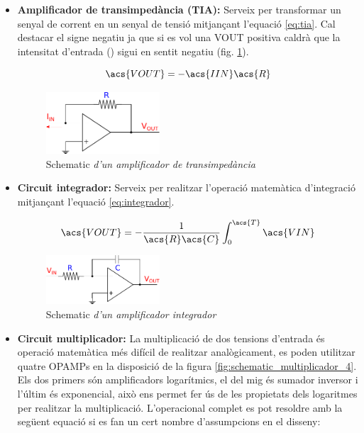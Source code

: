 \begin{itemize}
	\item{\textbf{Amplificador de transimpedància (\ac{TIA}): }}Serveix per transformar un senyal de corrent en un senyal de tensió mitjançant l'equació \ref{eq:tia}. Cal destacar el signe negatiu ja que si es vol una \ac{VOUT} positiva caldrà que la intensitat d'entrada () sigui en sentit negatiu (fig. \ref{fig:schematic_transimpedancia}).
	
	\begin{equation}\label{eq:tia}
	\acs{VOUT} = -\acs{IIN}\acs{R}
	\end{equation}
	
	\begin{figure}[htp]
		\centering
		\includegraphics[width=0.4\textwidth]{Figures/schematic_transimpedancia.pdf}
		\caption[Amplificador de transimpedància]{Schematic\textit{ d'un amplificador de transimpedància}}
		\label{fig:schematic_transimpedancia}
	\end{figure}
	
	\item {\textbf{Circuit integrador: }}Serveix per realitzar l'operació matemàtica d'integració mitjançant l'equació \ref{eq:integrador}.
	
	\begin{equation}\label{eq:integrador}
	\acs{VOUT} = -\frac{\num{1}}{\acs{R}\acs{C}}\int_{\num{0}}^{\acs{T}}\acs{VIN}
	\end{equation}
	
	\begin{figure}[htp]
		\centering
		\includegraphics[width=0.4\textwidth]{Figures/schematic_integrator.pdf}
		\caption[Amplificador integrador]{Schematic\textit{ d'un amplificador integrador}}
		\label{fig:schematic_integrador}
	\end{figure}
	
	\item{\textbf{Circuit multiplicador: }}La multiplicació de dos tensions d'entrada és operació matemàtica més difícil de realitzar analògicament, es poden utilitzar quatre \acp{OPAMP} en la disposició de la figura \ref{fig:schematic_multiplicador_4}. Els dos primers són amplificadors logarítmics, el del mig és sumador inversor i l'últim és exponencial, això ens permet fer ús de les propietats dels logaritmes per realitzar la multiplicació. L'operacional complet es pot resoldre amb la següent equació si es fan un cert nombre d'assumpcions en el disseny:
	

\end{itemize}
